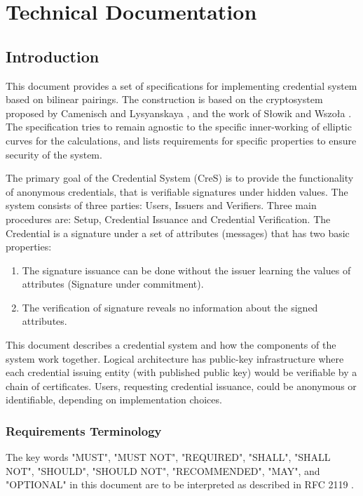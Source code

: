 \chapter{Technical Documentation}
\thispagestyle{chapterBeginStyle}



\section{Introduction}
This document provides a set of specifications for implementing credential system based on bilinear pairings. The construction is based on the cryptosystem proposed by Camenisch and Lysyanskaya \cite{anon-creds-cl04}, and the work of Słowik and Wszoła \cite{slowik-efficient-cl-lrsw}. The specification tries to remain agnostic to the specific inner-working of elliptic curves for the calculations, and lists requirements for specific properties to ensure security of the system.

The primary goal of the Credential System (CreS) is to provide the functionality of anonymous credentials, that is verifiable signatures under hidden values. The system consists of three parties: Users, Issuers and Verifiers. Three main procedures are: Setup, Credential Issuance and Credential Verification. The Credential is a signature under a set of attributes (messages) that has two basic properties:
\begin{enumerate}
    \item The signature issuance can be done without the issuer learning the values of attributes (Signature under commitment).
    \item The verification of signature reveals no information about the signed attributes.
\end{enumerate}

This document describes a credential system and how the components of the system work together. Logical architecture has public-key infrastructure where each credential issuing entity (with published public key) would be verifiable by a chain of certificates. Users, requesting credential issuance, could be anonymous or identifiable, depending on implementation choices.


\subsection*{Requirements Terminology}
The key words "MUST", "MUST NOT", "REQUIRED", "SHALL", "SHALL NOT", "SHOULD", "SHOULD NOT", "RECOMMENDED",  "MAY", and "OPTIONAL" in this document are to be interpreted as described in RFC 2119 \cite{rfc2119}.



